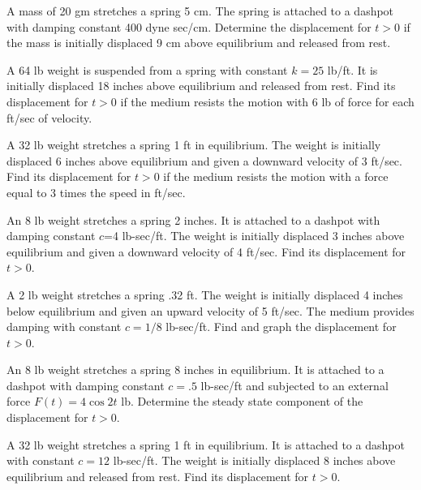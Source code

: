 \begin{exerciselist}
  \item\label{exer:6.2.8} A mass of 20 gm stretches a spring 5 cm. The spring is attached to a
        dashpot with damping constant 400 dyne sec/cm. Determine the displacement for $t>0$ if the
        mass is initially displaced 9 cm above equilibrium and released from rest.

  \item\label{exer:6.2.9} A 64 lb weight is suspended from a spring with constant $k=25$ lb/ft. It
        is initially displaced 18 inches above equilibrium and released from rest. Find its
        displacement for $t>0$ if the medium resists the motion with 6 lb of force for each ft/sec
        of velocity.

  \item\label{exer:6.2.10} A 32 lb weight stretches a spring 1 ft in equilibrium. The weight is
        initially displaced 6 inches above equilibrium and given a downward velocity of 3 ft/sec.
        Find its displacement for $t>0$ if the medium resists the motion with a force equal to 3
        times the speed in ft/sec.

  \item\label{exer:6.2.11} An 8 lb weight stretches a spring 2 inches. It is attached to a dashpot
        with damping constant $c$=4 lb-sec/ft. The weight is initially displaced 3 inches above
        equilibrium and given a downward velocity of 4 ft/sec. Find its displacement for $t>0$.

  \item\label{exer:6.2.12} \CGex A 2 lb weight stretches a spring .32 ft. The weight is initially
        displaced 4 inches below equilibrium and given an upward velocity of 5 ft/sec. The medium
        provides damping with constant $c=1/8$ lb-sec/ft. Find and graph the displacement for $t>0$.

  \item\label{exer:6.2.13} An 8 lb weight stretches a spring 8 inches in equilibrium. It is attached
        to a dashpot with damping constant $c=.5$ lb-sec/ft and subjected to an external force
        $F(t)=4\cos2t$ lb. Determine the steady state component of the displacement for $t>0$.

  \item\label{exer:6.2.14} A 32 lb weight stretches a spring 1 ft in equilibrium. It is attached to
        a dashpot with constant $c=12$ lb-sec/ft. The weight is initially displaced 8 inches above
        equilibrium and released from rest. Find its displacement for $t>0$.


\end{exerciselist}

